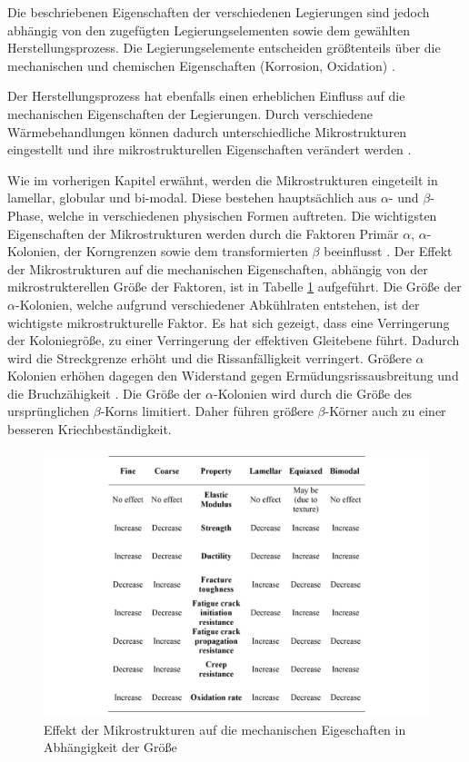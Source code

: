 Die beschriebenen Eigenschaften der verschiedenen Legierungen sind jedoch abhängig von den zugefügten Legierungselementen sowie dem gewählten Herstellungsprozess.
Die Legierungselemente entscheiden größtenteils über die mechanischen und chemischen Eigenschaften (Korrosion, Oxidation) \cite{C.Leyens.2005,Lutjering.2007,M.J.Donachie.2010}.

Der Herstellungsprozess hat ebenfalls einen erheblichen Einfluss auf die mechanischen Eigenschaften der Legierungen. Durch verschiedene Wärmebehandlungen können dadurch unterschiedliche Mikrostrukturen eingestellt und ihre mikrostrukturellen Eigenschaften verändert werden \cite{C.Leyens.2005,Lutjering.2007,Boyer.2007,M.J.Donachie.2010}.

Wie im vorherigen Kapitel erwähnt, werden die Mikrostrukturen eingeteilt in lamellar, globular und bi-modal. Diese bestehen hauptsächlich aus $\alpha$- und $\beta$-Phase, welche in verschiedenen physischen Formen auftreten. Die wichtigsten Eigenschaften der Mikrostrukturen werden durch die Faktoren Primär $\alpha$, $\alpha$-Kolonien, der Korngrenzen sowie dem transformierten $\beta$ beeinflusst \cite{C.Leyens.2005,Lutjering.2007,Boyer.2007}. Der Effekt der Mikrostrukturen auf die mechanischen Eigenschaften, abhängig von der mikrostrukterellen Größe der Faktoren, ist in Tabelle \ref{fig:tabelle-3} aufgeführt. Die Größe der $\alpha$-Kolonien, welche aufgrund verschiedener Abkühlraten entstehen, ist der wichtigste mikrostrukturelle Faktor. Es hat sich gezeigt, dass eine Verringerung der Koloniegröße, zu einer Verringerung der effektiven Gleitebene führt. Dadurch wird die Streckgrenze erhöht und die Rissanfälligkeit verringert. Größere $\alpha$ Kolonien erhöhen dagegen den Widerstand gegen Ermüdungsrissausbreitung und die Bruchzähigkeit \cite{C.Leyens.2005,Lutjering.2007,M.J.Donachie.2010}. Die Größe der $\alpha$-Kolonien wird durch die Größe des ursprünglichen $\beta$-Korns limitiert. Daher führen größere $\beta$-Körner auch zu einer besseren Kriechbeständigkeit.

\begin{figure}[h]
	\centering
	\includegraphics[width=0.9\linewidth]{./Bilder/Tabelle 3}
	\caption[Tabelle]{Effekt der Mikrostrukturen auf die mechanischen Eigeschaften in Abhängigkeit der Größe \cite{Boyer.2007}}
	\label{fig:tabelle-3}
\end{figure}

